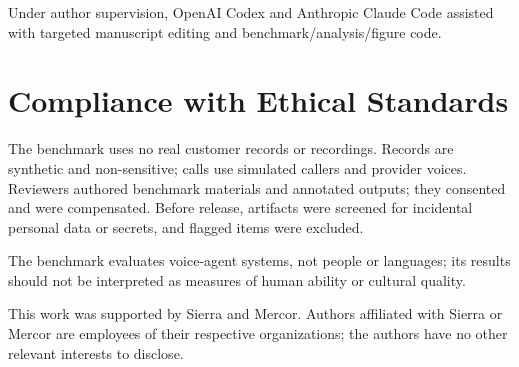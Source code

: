 \documentclass{article}
\begin{document}
Under author supervision, OpenAI Codex and Anthropic Claude Code assisted with
targeted manuscript editing and benchmark/analysis/figure code.

\clearpage

\section{Compliance with Ethical Standards}

The benchmark uses no real customer records or recordings. Records are
synthetic and non-sensitive; calls use simulated callers and provider voices.
Reviewers authored benchmark materials and annotated outputs; they consented
and were compensated. Before release, artifacts were screened for incidental
personal data or secrets, and flagged items were excluded.

The benchmark evaluates voice-agent systems, not people or languages; its
results should not be interpreted as measures of human ability or cultural
quality.

This work was supported by Sierra and Mercor. Authors affiliated with Sierra or
Mercor are employees of their respective organizations; the authors have no
other relevant interests to disclose.



\end{document}
